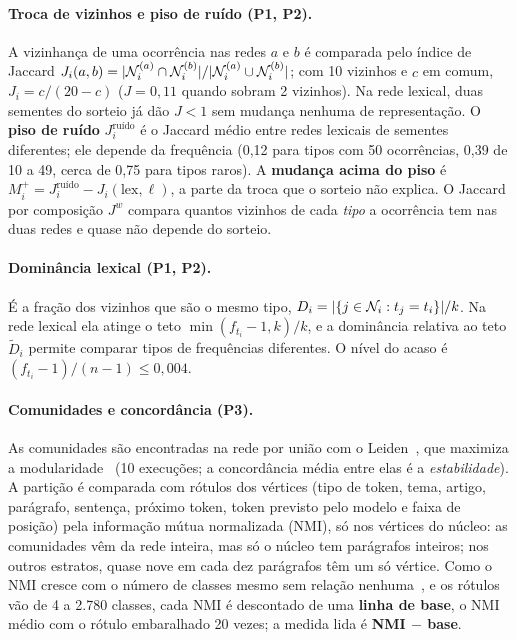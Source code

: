 \paragraph{Troca de vizinhos e piso de ruído (P1, P2).} A vizinhança de uma ocorrência nas
redes $a$ e $b$ é comparada pelo índice de Jaccard $J_i(a,b)=|\mathcal{N}_i^{(a)}\cap\mathcal{N}_i^{(b)}|/
|\mathcal{N}_i^{(a)}\cup\mathcal{N}_i^{(b)}|$; com 10 vizinhos e $c$ em comum, $J_i=c/(20-c)$ ($J=0{,}11$
quando sobram 2 vizinhos). Na rede lexical, duas sementes do sorteio já dão $J<1$ sem mudança
nenhuma de representação. O \textbf{piso de ruído} $J^{\text{ruído}}_i$ é o Jaccard médio entre
redes lexicais de sementes diferentes; ele depende da frequência (0,12 para tipos com 50
ocorrências, 0,39 de 10 a 49, cerca de 0,75 para tipos raros). A \textbf{mudança acima do
piso} é $M^{+}_i=J^{\text{ruído}}_i-J_i(\mathrm{lex},\ell)$, a parte da troca que o sorteio não
explica. O Jaccard por composição $J^w$ compara quantos vizinhos de cada \emph{tipo} a
ocorrência tem nas duas redes e quase não depende do sorteio.

\paragraph{Dominância lexical (P1, P2).} É a fração dos vizinhos que são o mesmo tipo,
$D_i=|\{j\in\mathcal{N}_i:t_j=t_i\}|/k$. Na rede lexical ela atinge o teto $\min(f_{t_i}-1,k)/k$, e a
dominância relativa ao teto $\tilde D_i$ permite comparar tipos de frequências diferentes. O
nível do acaso é $(f_{t_i}-1)/(n-1)\le0{,}004$.

\paragraph{Comunidades e concordância (P3).} As comunidades são encontradas na rede por união
com o Leiden~\cite{traag2019}, que maximiza a modularidade~\cite{newman2006} (10 execuções; a
concordância média entre elas é a \emph{estabilidade}). A partição é comparada com rótulos dos
vértices (tipo de token, tema, artigo, parágrafo, sentença, próximo token, token previsto pelo
modelo e faixa de posição) pela informação mútua normalizada
(NMI), só nos vértices do núcleo: as comunidades vêm da rede inteira, mas só o núcleo tem
parágrafos inteiros; nos outros estratos, quase nove em cada dez parágrafos têm um só vértice. Como o NMI cresce com o número de classes mesmo sem relação nenhuma~\cite{vinh2010}, e
os rótulos vão de 4 a 2.780 classes, cada NMI é descontado de uma \textbf{linha de base}, o NMI
médio com o rótulo embaralhado 20 vezes; a medida lida é \textbf{NMI $-$ base}.

